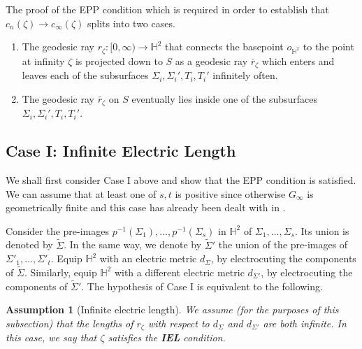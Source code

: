 \documentclass{amsart}
\newtheorem{assumption}[theorem]{Assumption}
\theoremstyle{definition}
\newcommand{\hyperbolic}{\mathbb{H}}
\newcommand\HHH{{\mathbb H}}
\newcommand\til{\widetilde}
\begin{document}
The proof of the EPP condition which is required in order to establish that $c_n (\zeta) \to c_\infty (\zeta)$ splits into two cases. 
\begin{enumerate}
	
	\item The geodesic ray $r_\zeta\colon [0,\infty) \to \HHH^2$ that connects the basepoint $o_{\HHH^2}$ to the point at infinity $\zeta$ is projected down to $S$ as a geodesic ray $\bar r_\zeta$ which enters and leaves each of the subsurfaces $\Sigma_i, \Sigma_i', T_i, T_i'$ infinitely often.
	\item The geodesic ray $\bar r_\zeta$ on $S$ eventually lies inside one of the subsurfaces $\Sigma_i, \Sigma_i', T_i, T_i'$.
\end{enumerate}


\subsection{Case I: Infinite Electric Length}
\label{case IEL}
We shall first consider Case I above and show that the EPP condition is satisfied.
We can assume that at least one of $s, t$ is positive since otherwise $G_\infty$ is geometrically finite and this case has already been dealt with in \cite{mahan-series1}.

Consider the pre-images $p^{-1}(\Sigma_1), \dots , p^{-1}(\Sigma_s)$ in $\hyperbolic^2$ of $\Sigma_1, \dots , \Sigma_s$.  Its union is denoted by $\widetilde \Sigma$.
In the same way, we denote by $\widetilde \Sigma'$ the union of the pre-images of $\Sigma'_1, \dots , \Sigma'_t$.
Equip $\HHH^2$ with an  electric metric $d_\Sigma$, by electrocuting  the components of $\widetilde \Sigma$.
Similarly, equip $\HHH^2$ with a different  electric metric $d_{\Sigma'}$, by electrocuting  the components of $\widetilde \Sigma'$.
The hypothesis of Case I is equivalent to the following.

\begin{assumption}[Infinite electric length]
\label{iel}
We assume (for the purposes of this subsection) that the lengths of $r_\zeta$ with respect to $d_\Sigma$ and $d_{\Sigma'}$ are both infinite.
In this case, we say that $\zeta$ satisfies the {\bf IEL} condition.
\end{assumption}
\end{document}
